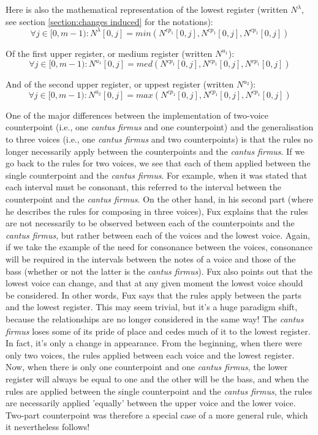 Here is also the mathematical representation of the lowest register (written $N^{\lambda}$, see section \ref{section:changes induced} for the notations):
\begin{equation}
    \forall j \in [0, m-1) : N^{\lambda}[0,j] = min(N^{cp_1}[0,j], N^{cp_1}[0,j], N^{cp_1}[0,j])
\end{equation}

Of the first upper register, or medium register (written $N^{u_1}$):
\begin{equation}
    \forall j \in [0, m-1) : N^{u_1}[0,j] = med(N^{cp_1}[0,j], N^{cp_1}[0,j], N^{cp_1}[0,j])
\end{equation}

And of the second upper register, or uppest register (written $N^{u_2}$):
\begin{equation}
    \forall j \in [0, m-1) : N^{u_2}[0,j] = max(N^{cp_1}[0,j], N^{cp_1}[0,j], N^{cp_1}[0,j])
\end{equation}

One of the major differences between the implementation of two-voice counterpoint (i.e., one \textit{cantus firmus} and one counterpoint) and the generalisation to three voices (i.e., one \textit{cantus firmus} and two counterpoints) is that the rules no longer necessarily apply between the counterpoints and the \textit{cantus firmus}. If we go back to the rules for two voices, we see that each of them applied between the single counterpoint and the \textit{cantus firmus}. For example, when it was stated that each interval must be consonant, this referred to the interval between the counterpoint and the \textit{cantus firmus}.
On the other hand, in his second part (where he describes the rules for composing in three voices), Fux explains that the rules are not necessarily to be observed between each of the counterpoints and the \textit{cantus firmus}, but rather between each of the voices and the lowest voice. Again, if we take the example of the need for consonance between the voices, consonance will be required in the intervals between the notes of a voice and those of the bass (whether or not the latter is the \textit{cantus firmus}).
Fux also points out that the lowest voice can change, and that at any given moment the lowest voice should be considered. In other words, Fux says that the rules apply between the parts and the lowest register.
This may seem trivial, but it's a huge paradigm shift, because the relationships are no longer considered in the same way! The \textit{cantus firmus} loses some of its pride of place and cedes much of it to the lowest register.
In fact, it's only a change in appearance. From the beginning, when there were only two voices, the rules applied between each voice and the lowest register. Now, when there is only one counterpoint and one \textit{cantus firmus}, the lower register will always be equal to one and the other will be the bass, and when the rules are applied between the single counterpoint and the \textit{cantus firmus}, the rules are necessarily applied 'equally' between the upper voice and the lower voice. Two-part counterpoint was therefore a special case of a more general rule, which it nevertheless follows!


